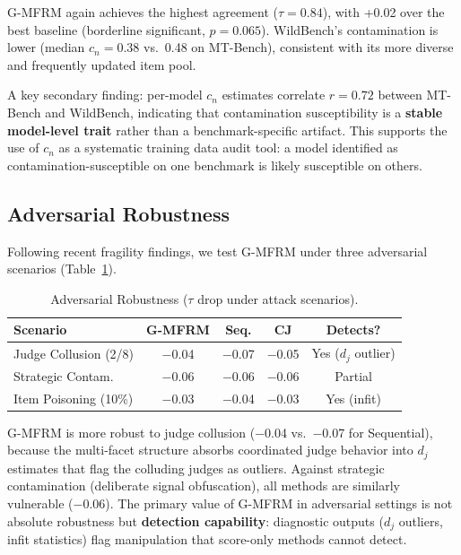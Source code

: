 \documentclass[11pt]{article}
\newcommand{\gmfrm}{G-MFRM}
\newcommand{\cn}{c_n}
\newcommand{\severity}{d_j}
\begin{document}
\gmfrm{} again achieves the highest agreement ($\tau = 0.84$), with +0.02 over the best baseline (borderline significant, $p = 0.065$).
WildBench's contamination is lower (median $\cn = 0.38$ vs.\ 0.48 on MT-Bench), consistent with its more diverse and frequently updated item pool.

A key secondary finding: per-model $\cn$ estimates correlate $r = 0.72$ between MT-Bench and WildBench, indicating that contamination susceptibility is a \textbf{stable model-level trait} rather than a benchmark-specific artifact.
This supports the use of $\cn$ as a systematic training data audit tool: a model identified as contamination-susceptible on one benchmark is likely susceptible on others.

\subsection{Adversarial Robustness}

Following recent fragility findings, we test \gmfrm{} under three adversarial scenarios (Table~\ref{tab:adversarial}).

\begin{table}[t]
\centering
\caption{Adversarial Robustness ($\tau$ drop under attack scenarios).}
\label{tab:adversarial}
\small
\begin{tabular}{lcccc}
\toprule
Scenario & \gmfrm{} & Seq. & CJ & Detects? \\
\midrule
Judge Collusion (2/8) & $-$0.04 & $-$0.07 & $-$0.05 & Yes ($\severity$ outlier) \\
Strategic Contam. & $-$0.06 & $-$0.06 & $-$0.06 & Partial \\
Item Poisoning (10\%) & $-$0.03 & $-$0.04 & $-$0.03 & Yes (infit) \\
\bottomrule
\end{tabular}
\end{table}

\gmfrm{} is more robust to judge collusion ($-$0.04 vs.\ $-$0.07 for Sequential), because the multi-facet structure absorbs coordinated judge behavior into $\severity$ estimates that flag the colluding judges as outliers.
Against strategic contamination (deliberate signal obfuscation), all methods are similarly vulnerable ($-$0.06).
The primary value of \gmfrm{} in adversarial settings is not absolute robustness but \textbf{detection capability}: diagnostic outputs ($\severity$ outliers, infit statistics) flag manipulation that score-only methods cannot detect.
\end{document}
